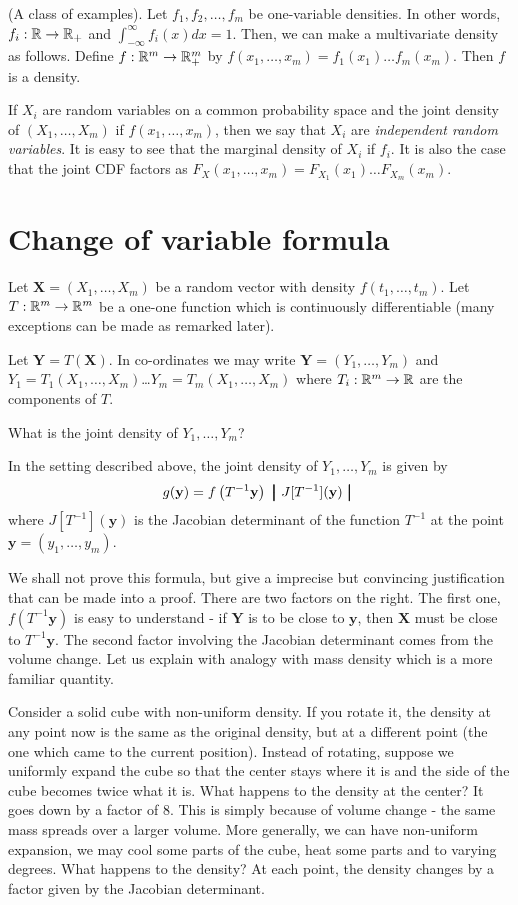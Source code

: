 \documentclass[preprint,  11pt]{amsart}
\def\X{\mathbf{X}}
\def\Y{\mathbf{Y}}
\begin{document}
\beg (A class of examples). Let $f_{1},f_{2},\ldots ,f_{m}$ be one-variable densities. In other words, $f_{i}:\mathbb{R}\rightarrow \mathbb{R}_{+}$ and $\int_{-\infty}^{\infty}f_{i}(x)dx=1$. Then, we can make a multivariate density as follows. Define $f:\mathbb{R}^{m}\rightarrow \mathbb{R}_{+}^{m}$ by $f(x_{1},\ldots ,x_{m})=f_{1}(x_{1})\ldots f_{m}(x_{m})$. Then $f$ is a density.

If $X_{i}$ are random variables on a common probability space and the joint density of $(X_{1},\ldots ,X_{m})$  if $f(x_{1},\ldots ,x_{m})$, then we say that $X_{i}$ are {\em independent random variables}. It is easy to see that the marginal density of $X_{i}$ if $f_{i}$. It is also the case that the joint CDF factors as $F_{X}(x_{1},\ldots ,x_{m})=F_{X_{1}}(x_{1})\ldots F_{X_{m}}(x_{m})$.
\eeg
\section{Change of variable formula}
Let $\X=(X_{1},\ldots ,X_{m})$ be a random vector with density $f(t_{1},\ldots ,t_{m})$. Let $T:\mathbb{R}^{m}\rightarrow \mathbb{R}^{m}$ be a one-one function which is continuously differentiable (many exceptions can be made as remarked later).

Let $\Y=T(\X)$. In co-ordinates we may write $\Y=(Y_{1},\ldots ,Y_{m})$ and $Y_{1}=T_{1}(X_{1},\ldots ,X_{m})$\dots $Y_{m}=T_{m}(X_{1},\ldots ,X_{m})$ where $T_{i}:\mathbb{R}^{m}\rightarrow \mathbb{R}$ are the components of $T$.

 What is the joint density of $Y_{1},\ldots ,Y_{m}$?

 In the setting described above,  the joint density of $Y_{1},\ldots ,Y_{m}$ is given by
$$
g(\mathbf{y})=f\left(T^{-1}\mathbf{y}\right)\ \pmb{\big|} \  J[T^{-1}](\mathbf{y})\ \pmb{\big|} \ 
$$
where $J[T^{-1}](\mathbf{y})$ is the Jacobian determinant of the function $T^{-1}$ at the point $\mathbf{y}=(y_{1},\ldots ,y_{m})$.

 We shall not prove this formula, but give a imprecise but convincing justification that can be made into a proof. There are two factors on the right.  The first one, $f(T^{-1}\mathbf{y})$ is easy to understand - if $\Y$ is to be close to $\mathbf{y}$, then $\X$ must be close to $T^{-1}\mathbf{y}$. The second factor involving the Jacobian determinant comes from the volume change. Let us explain with analogy with mass density which is a more familiar quantity.

Consider a solid cube with non-uniform density. If you rotate it, the density at any point now is the same as the original density, but at a different point (the one which came to the current position). Instead of rotating, suppose we uniformly expand the cube so that the center stays where it is and the side of the cube becomes twice what it is. What happens to the density at the center? It goes down by a factor of $8$. This is simply because of volume change - the same mass spreads over a larger volume. More generally, we can have non-uniform expansion, we may cool some parts of the cube, heat some parts and to varying degrees. What happens to the density? At each point, the density changes by a factor given by the Jacobian determinant.
\end{document}
